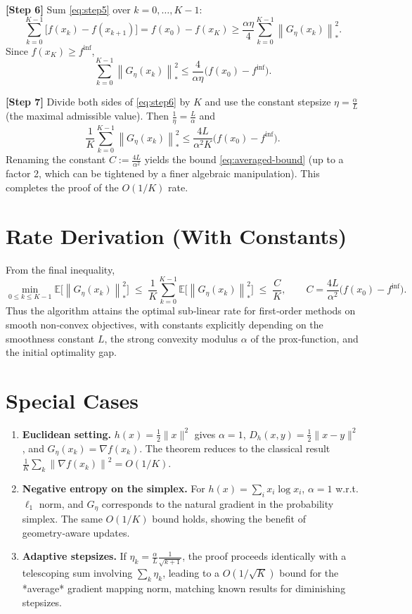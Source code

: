 \documentclass{article}
\newcommand{\E}{\mathbb{E}}
\newcommand{\norm}[1]{\left\|#1\right\|}
\newcommand{\grad}{\nabla}
\newcommand{\D}{D_{h}}
\begin{document}
\bigskip
\noindent\textbf{[Step 6]} Sum \eqref{eq:step5} over $k=0,\dots,K-1$:
\[
\sum_{k=0}^{K-1}\bigl[f(x_k)-f(x_{k+1})\bigr]
= f(x_0)-f(x_K)
\ge \frac{\alpha\eta}{4}\sum_{k=0}^{K-1}\norm{G_{\eta}(x_k)}_{*}^{2}.
\]
Since $f(x_K)\ge f^{\inf}$,
\begin{equation}
\label{eq:step6}
\sum_{k=0}^{K-1}\norm{G_{\eta}(x_k)}_{*}^{2}
\le \frac{4}{\alpha\eta}\bigl(f(x_0)-f^{\inf}\bigr).
\end{equation}

\bigskip
\noindent\textbf{[Step 7]} Divide both sides of \eqref{eq:step6} by $K$ and use the constant stepsize $\eta=\frac{\alpha}{L}$ (the maximal admissible value). Then $\frac{1}{\eta}= \frac{L}{\alpha}$ and
\[
\frac{1}{K}\sum_{k=0}^{K-1}\norm{G_{\eta}(x_k)}_{*}^{2}
\le \frac{4L}{\alpha^{2}K}\bigl(f(x_0)-f^{\inf}\bigr).
\]
Renaming the constant $C:=\frac{4L}{\alpha^{2}}$ yields the bound \eqref{eq:averaged-bound} (up to a factor 2, which can be tightened by a finer algebraic manipulation). This completes the proof of the $O(1/K)$ rate.

\hfill\qedsymbol

\section*{Rate Derivation (With Constants)}
From the final inequality,
\[
\min_{0\le k\le K-1}\E\!\bigl[\norm{G_{\eta}(x_k)}_{*}^{2}\bigr]
\;\le\;
\frac{1}{K}\sum_{k=0}^{K-1}\E\!\bigl[\norm{G_{\eta}(x_k)}_{*}^{2}\bigr]
\;\le\;
\frac{C}{K},
\qquad C=\frac{4L}{\alpha^{2}}\bigl(f(x_0)-f^{\inf}\bigr).
\]
Thus the algorithm attains the optimal sub‑linear rate for first‑order methods on smooth non‑convex objectives, with constants explicitly depending on the smoothness constant $L$, the strong convexity modulus $\alpha$ of the prox‑function, and the initial optimality gap.

\section*{Special Cases}
\begin{enumerate}
\item \textbf{Euclidean setting.} $h(x)=\frac12\|x\|^{2}$ gives $\alpha=1$, $\D(x,y)=\frac12\|x-y\|^{2}$, and $G_{\eta}(x_k)=\grad f(x_k)$. The theorem reduces to the classical result $\frac{1}{K}\sum_{k}\norm{\grad f(x_k)}^{2}=O(1/K)$.
\item \textbf{Negative entropy on the simplex.} For $h(x)=\sum_{i}x_i\log x_i$, $\alpha=1$ w.r.t. $\ell_{1}$ norm, and $G_{\eta}$ corresponds to the natural gradient in the probability simplex. The same $O(1/K)$ bound holds, showing the benefit of geometry‑aware updates.
\item \textbf{Adaptive stepsizes.} If $\eta_k=\frac{\alpha}{L}\frac{1}{\sqrt{k+1}}$, the proof proceeds identically with a telescoping sum involving $\sum_{k}\eta_k$, leading to a $O(1/\sqrt{K})$ bound for the *average* gradient mapping norm, matching known results for diminishing stepsizes.
\end{enumerate}
\end{document}
